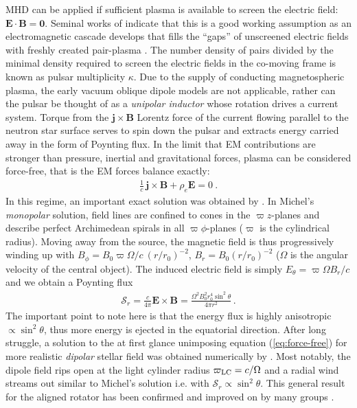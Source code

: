 MHD can be applied if sufficient plasma is available to screen the electric field: $\mathbf{E\cdot B=0}$.  Seminal works of \cite{deutsch1955,1969ApJ...157..869G} indicate that this is a good working assumption as an electromagnetic cascade develops that fills the ``gaps'' of unscreened electric fields with freshly created pair-plasma \citep{Sturrock1971}.  
The number density of pairs divided by the minimal density required to screen the electric fields in the co-moving frame is known as pulsar multiplicity $\kappa$.  
Due to the supply of conducting magnetospheric plasma, the early vacuum oblique dipole models \citep[e.g.][]{pacini1967,Ostriker:1969} are not applicable, rather can the pulsar be thought of as a \emph{unipolar inductor} whose rotation drives a current system.  Torque from the $\mathbf{j\times B}$ Lorentz force of the current flowing parallel to  the neutron star surface serves to spin down the pulsar and extracts energy carried away in the form of Poynting flux.  
In the limit that EM contributions are stronger than pressure, inertial and gravitational forces, plasma can be considered force-free, that is the EM forces balance exactly: 
\begin{align}
\frac{1}{c}\, \mathbf{j\times B}+\rho_e \mathbf{E}=0\ . \label{eq:force-free}
\end{align}
In this regime, an important exact solution was obtained by \cite{1973ApJ...180L.133M}.  In Michel's \emph{monopolar} solution, field lines are confined to cones in the $\varpi z$-planes and describe perfect Archimedean spirals in all $\varpi\phi$-planes ($\varpi$ is the cylindrical radius).  Moving away from the source, the magnetic field is thus progressively winding up with $B_\phi=B_0\varpi\Omega/c\ (r/r_0)^{-2}$, $B_r=B_0(r/r_0)^{-2}$ ($\Omega$ is the angular velocity of the central object).  The induced electric field is simply $E_\theta = \varpi \Omega B_r/c$ and we obtain a Poynting flux 
%
\begin{align}
\mathcal{S}_r=\frac{c}{4\pi} \mathbf{E\times B} = \frac{\Omega^2 B_0^2 r_0^4 \sin^2\theta  }{4\pi r^2}\, . \label{eq:michelpower}
\end{align}
%
The important point to note here is that the energy flux is highly anisotropic $\propto \sin^2\theta$, thus more energy is ejected in the equatorial direction.  
After long struggle, a solution to the at first glance unimposing equation (\ref{eq:force-free}) for more realistic \emph{dipolar} stellar field was obtained numerically by \cite{1999ApJ...511..351C}.  
Most notably, the dipole field rips open at the light cylinder radius $\varpi_{\rm LC} = c/\Omega$ and a radial wind streams out similar to Michel's solution i.e. with $\mathcal{S}_r\propto \sin^2\theta$.  This general result for the aligned rotator has been confirmed and improved on by many groups \citep{2004MNRAS.349..213G,2005PhRvL..94b1101G,2006MNRAS.368L..30M,ParfreyBeloborodov2012,RuizPaschalidis2014}.  
